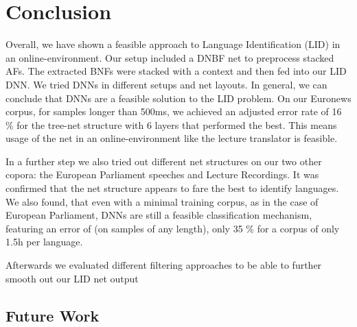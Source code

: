 
\chapter{Conclusion}
\label{ch:Conclusion}

Overall, we have shown a feasible approach to Language Identification (LID) in an online-environment. Our setup included a DNBF net to preprocess stacked AFs. The extracted BNFs were stacked with a context and then fed into our LID DNN.  We tried DNNs in different setups and net layouts. In general, we can conclude that DNNs are a feasible solution to the LID problem. On our Euronews corpus, for samples longer than 500ms, we achieved an adjusted error rate of 16 \% for the tree-net structure with 6 layers that performed the best. This means usage of the net in an online-environment like the lecture translator is feasible.

In a further step we also tried out different net structures on our two other copora: the European Parliament speeches and Lecture Recordings. It was confirmed that the net structure appears to fare the best to identify languages. We also found, that even with a minimal training corpus, as in the case of European Parliament, DNNs are still a feasible classification mechanism, featuring an error of (on samples of any length), only 35 \% for a corpus of only 1.5h per language.

Afterwards we evaluated different filtering approaches to be able to further smooth out our LID net output 

\section{Future Work}
\label{sec:fw}